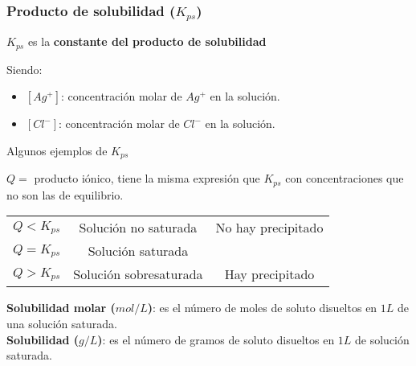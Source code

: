     \subsubsection{Producto de solubilidad ($K_{ps}$)}
    \begin{center} $K_{ps}$ es la \textbf{constante del producto de solubilidad} \end{center}
    Siendo:
    \begin{itemize}
        \item $[Ag^+]$: concentración molar de $Ag^+$ en la solución.
        \item $[Cl^-]$: concentración molar de $Cl^-$ en la solución.
    \end{itemize}
    \begin{center} Algunos ejemplos de $K_{ps}$ \end{center}
    \sangria{} $Q =$ producto iónico, tiene la misma expresión que $K_{ps}$ con concentraciones que no son las de equilibrio.
    \begin{center}
        \begin{tabular}{ccc}
            \multicolumn{1}{c}{$Q<K_{ps}$} &
            \multicolumn{1}{c}{Solución no saturada} &
            \multicolumn{1}{c}{No hay precipitado} \\[5pt]

            \multicolumn{1}{c}{$Q = K_{ps}$} &
            \multicolumn{1}{c}{Solución saturada} &
            \multicolumn{1}{c}{} \\[5pt]

            \multicolumn{1}{c}{$Q>K_{ps}$} &
            \multicolumn{1}{c}{Solución sobresaturada} &
            \multicolumn{1}{c}{Hay precipitado} \\[5pt]

        \end{tabular}
    \end{center}
    \saltoPag{}
    \textbf{Solubilidad molar ($mol/L$)}: es el número de moles de soluto disueltos en $1L$ de una solución saturada. \\
    \textbf{Solubilidad ($g/L$)}: es el número de gramos de soluto disueltos en $1L$ de solución saturada.
